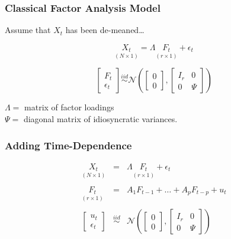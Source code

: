 \begin{frame}[c]\frametitle{Classical Factor Analysis Model}
    

  \alert{Assume that $X_t$ has been de-meaned\dots}

\vspace{1em}
$$\underset{(N\times 1)}{X_t} =  \Lambda \underset{(r\times 1)}{F_t} + \epsilon_t$$

\vspace{2em}

\small

$$
\left[ \begin{array}
	{c} F_t \\ \epsilon_t
\end{array}\right]
\overset{iid}{\sim} \mathcal{N}\left(
\left[ \begin{array}
	{c} 0\\ 0 
\end{array}\right],
\left[ \begin{array}
	{cc} I_r & 0\\
	0 & \Psi
\end{array}\right]\right)$$
\vspace{1em}

$\Lambda = $ matrix of factor loadings\\
$\Psi = $ diagonal matrix of idiosyncratic variances.
\end{frame}
\begin{frame}
	\frametitle{Adding Time-Dependence}

\begin{eqnarray*}
	\underset{(N\times 1)}{X_t} &=&  \Lambda \underset{(r\times 1)}{F_t} + \epsilon_t \\ \\
	\underset{(r\times 1)}{F_t} &=& A_1 F_{t-1} + \hdots + A_p F_{t-p} + u_t \\ \\
	\left[ \begin{array}
	{c} u_t \\ \epsilon_t
\end{array}\right]
&\overset{iid}{\sim}& \mathcal{N}\left(
\left[ \begin{array}
	{c} 0\\ 0 
\end{array}\right],
\left[ \begin{array}
	{cc} I_r & 0\\
	0 & \Psi
\end{array}\right]\right)
\end{eqnarray*}	


\end{frame}
